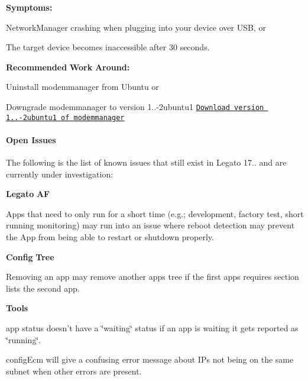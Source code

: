 {\bfseries Symptoms\+:} 
\begin{DoxyItemize}
\item Network\+Manager crashing when plugging into your device over U\+SB, or
\item The target device becomes inaccessible after 30 seconds.
\end{DoxyItemize}

{\bfseries Recommended} {\bfseries Work} {\bfseries Around\+:} 
\begin{DoxyItemize}
\item Uninstall {\ttfamily modemmanager} from Ubuntu or
\item Downgrade {\ttfamily modemmanager} to version 1..-\/2ubuntu1 \href{http://packages.ubuntu.com/trusty/modemmanager}{\tt Download version 1..-\/2ubuntu1 of modemmanager}
\end{DoxyItemize}\hypertarget{releaseNotes17072_rn17_07_OpenIssues}{}\paragraph{Open Issues}\label{releaseNotes17072_rn17_07_OpenIssues}
The following is the list of known issues that still exist in Legato 17.. and are currently under investigation\+:

{\bfseries Legato} {\bfseries AF} 
\begin{DoxyItemize}
\item Apps that need to only run for a short time (e.\+g.; development, factory test, short running monitoring) may run into an issue where reboot detection may prevent the App from being able to restart or shutdown properly.
\end{DoxyItemize}

{\bfseries Config} {\bfseries Tree} 
\begin{DoxyItemize}
\item Removing an {\ttfamily app} may remove another {\ttfamily apps} tree if the first {\ttfamily apps} requires section lists the second {\ttfamily app}.
\end{DoxyItemize}

{\bfseries Tools} 
\begin{DoxyItemize}
\item {\ttfamily app} {\ttfamily status} doesn’t have a \char`\"{}waiting\char`\"{} status if an app is waiting it gets reported as \char`\"{}running\char`\"{}.
\item {\ttfamily config\+Ecm} will give a confusing error message about IP\textquotesingle{}s not being on the same subnet when other errors are present.
\end{DoxyItemize}

